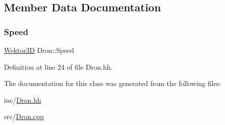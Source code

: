 \subsection{Member Data Documentation}
\mbox{\label{class_dron_af79b620c5f561d94e0e53b8f79bc66c7}} 
\subsubsection{\texorpdfstring{Speed}{Speed}}
{\footnotesize\ttfamily \hyperlink{_wektor3_d_8hh_ac353a272b38b4ad342f7181ad7bdb91a}{Wektor3D} Dron\+::\+Speed}



Definition at line 24 of file Dron.\+hh.



The documentation for this class was generated from the following files\+:\begin{DoxyCompactItemize}
\item 
inc/\hyperlink{_dron_8hh}{Dron.\+hh}\item 
src/\hyperlink{_dron_8cpp}{Dron.\+cpp}\end{DoxyCompactItemize}
